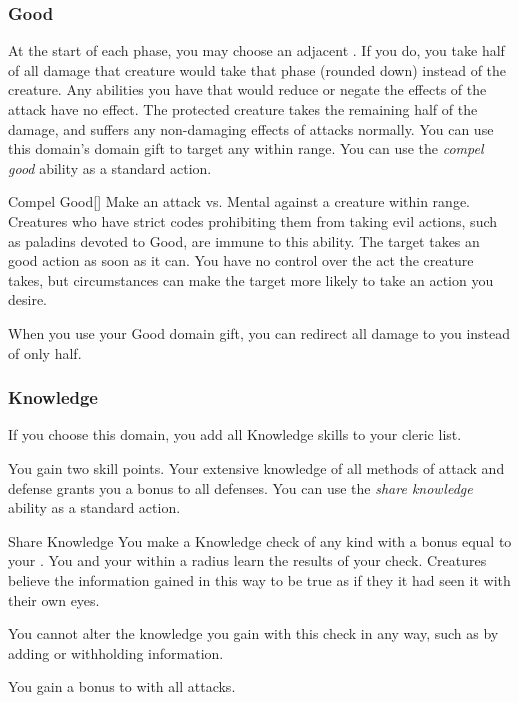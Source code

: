         \subsubsection{Good}
             At the start of each phase, you may choose an adjacent .
            If you do, you take half of all damage that creature would take that phase (rounded down) instead of the creature.
            Any abilities you have that would reduce or negate the effects of the attack have no effect.
            The protected creature takes the remaining half of the damage, and suffers any non-damaging effects of attacks normally.
             You can use this domain's domain gift to target any  within \rngclose range.
             You can use the \textit{compel good} ability as a standard action.
            \begin{freeability}{Compel Good}[]
                Make an attack vs. Mental against a creature within \rngmed range.
                Creatures who have strict codes prohibiting them from taking evil actions, such as paladins devoted to Good, are immune to this ability.
                \hit The target takes an good action as soon as it can.
                You have no control over the act the creature takes, but circumstances can make the target more likely to take an action you desire.
            \end{freeability}
             When you use your Good domain gift, you can redirect all damage to you instead of only half.

        \subsubsection{Knowledge}
            If you choose this domain, you add all Knowledge skills to your cleric  list.

             You gain two skill points.
             Your extensive knowledge of all methods of attack and defense grants you a  bonus to all defenses.
             You can use the \textit{share knowledge} ability as a standard action.
            \begin{freeability}{Share Knowledge}
                You make a Knowledge check of any kind with a bonus equal to your .
                You and your  within a \arealarge radius learn the results of your check.
                Creatures believe the information gained in this way to be true as if they it had seen it with their own eyes.

                You cannot alter the knowledge you gain with this check in any way, such as by adding or withholding information.
            \end{freeability}
             You gain a  bonus to  with all attacks.

